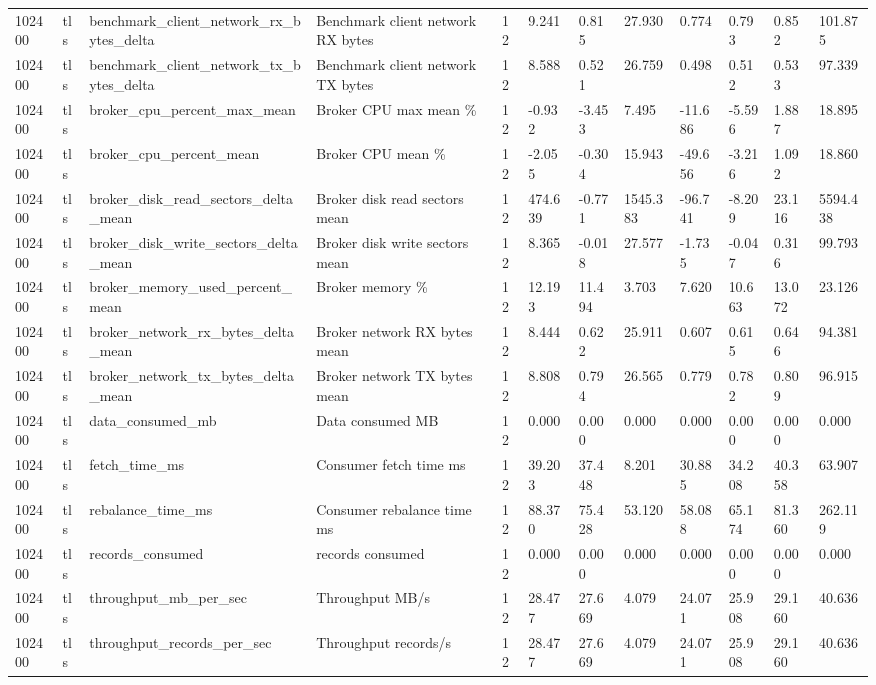 \begin{longtable}{llllllllllll}
102400 & tls & benchmark\_client\_network\_rx\_bytes\_delta & Benchmark client network RX bytes & 12 & 9.241 & 0.815 & 27.930 & 0.774 & 0.793 & 0.852 & 101.875 \\
102400 & tls & benchmark\_client\_network\_tx\_bytes\_delta & Benchmark client network TX bytes & 12 & 8.588 & 0.521 & 26.759 & 0.498 & 0.512 & 0.533 & 97.339 \\
102400 & tls & broker\_cpu\_percent\_max\_mean & Broker CPU max mean \% & 12 & -0.932 & -3.453 & 7.495 & -11.686 & -5.596 & 1.887 & 18.895 \\
102400 & tls & broker\_cpu\_percent\_mean & Broker CPU mean \% & 12 & -2.055 & -0.304 & 15.943 & -49.656 & -3.216 & 1.092 & 18.860 \\
102400 & tls & broker\_disk\_read\_sectors\_delta\_mean & Broker disk read sectors mean & 12 & 474.639 & -0.771 & 1545.383 & -96.741 & -8.209 & 23.116 & 5594.438 \\
102400 & tls & broker\_disk\_write\_sectors\_delta\_mean & Broker disk write sectors mean & 12 & 8.365 & -0.018 & 27.577 & -1.735 & -0.047 & 0.316 & 99.793 \\
102400 & tls & broker\_memory\_used\_percent\_mean & Broker memory \% & 12 & 12.193 & 11.494 & 3.703 & 7.620 & 10.663 & 13.072 & 23.126 \\
102400 & tls & broker\_network\_rx\_bytes\_delta\_mean & Broker network RX bytes mean & 12 & 8.444 & 0.622 & 25.911 & 0.607 & 0.615 & 0.646 & 94.381 \\
102400 & tls & broker\_network\_tx\_bytes\_delta\_mean & Broker network TX bytes mean & 12 & 8.808 & 0.794 & 26.565 & 0.779 & 0.782 & 0.809 & 96.915 \\
102400 & tls & data\_consumed\_mb & Data consumed MB & 12 & 0.000 & 0.000 & 0.000 & 0.000 & 0.000 & 0.000 & 0.000 \\
102400 & tls & fetch\_time\_ms & Consumer fetch time ms & 12 & 39.203 & 37.448 & 8.201 & 30.885 & 34.208 & 40.358 & 63.907 \\
102400 & tls & rebalance\_time\_ms & Consumer rebalance time ms & 12 & 88.370 & 75.428 & 53.120 & 58.088 & 65.174 & 81.360 & 262.119 \\
102400 & tls & records\_consumed & records consumed & 12 & 0.000 & 0.000 & 0.000 & 0.000 & 0.000 & 0.000 & 0.000 \\
102400 & tls & throughput\_mb\_per\_sec & Throughput MB/s & 12 & 28.477 & 27.669 & 4.079 & 24.071 & 25.908 & 29.160 & 40.636 \\
102400 & tls & throughput\_records\_per\_sec & Throughput records/s & 12 & 28.477 & 27.669 & 4.079 & 24.071 & 25.908 & 29.160 & 40.636 \\
\hline
\end{longtable}
